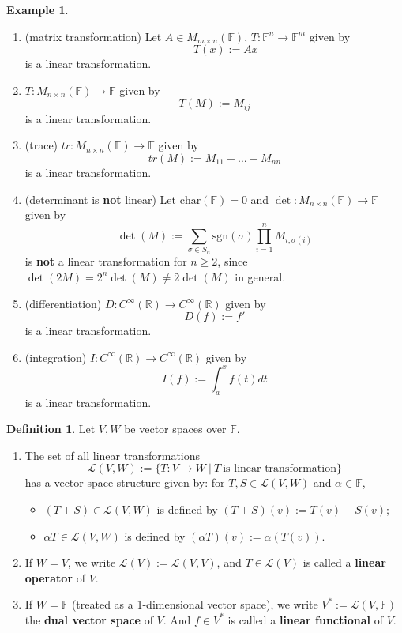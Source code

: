\documentclass[11pt,openany]{book}
\theoremstyle{plain}
\theoremstyle{definition}
\newtheorem{definition}[definition]{Definition}
\newtheorem{example}[example]{Example}
\theoremstyle{remark}
\begin{document}
\begin{example} \label{eg-lineartrans} \
    \begin{enumerate}
        \item (matrix transformation) Let $A \in M_{m \times n}(\mathbb{F})$, $T: \mathbb{F}^n \to \mathbb{F}^m$ given by 
        $$\quad \quad T(x) := Ax$$
        is a linear transformation.
        \item $T: M_{n \times n}(\mathbb{F}) \to \mathbb{F}$ given by 
        $$T(M) := M_{ij}$$ 
        is a linear transformation.
        \item (trace) $tr: M_{n \times n}(\mathbb{F}) \to \mathbb{F}$ given by 
        $$tr(M) := M_{11}+\dots + M_{nn}$$ 
        is a linear transformation.
        \item (determinant is {\bf not} linear) Let $\mathrm{char}(\mathbb{F}) = 0$ and $\det: M_{n \times n}(\mathbb{F}) \to \mathbb{F}$ given by 
        $$\det(M) := \sum_{\sigma \in S_n} \mathrm{sgn}(\sigma) \prod_{i=1}^n M_{i,\sigma(i)}$$ 
        is {\bf not} a linear transformation for $n \geq 2$, since
        $\det(2M) = 2^n\det(M) \neq 2\det(M)$ in general.
        \item (differentiation) $D: C^{\infty}(\mathbb{R}) \to C^{\infty}(\mathbb{R})$ given by 
        $$D(f) := f'$$ 
        is a linear transformation.
        \item (integration) $I: C^{\infty}(\mathbb{R}) \to C^{\infty}(\mathbb{R})$ given by 
        $$I(f) := \int_{a}^{x} f(t)dt$$ 
        is a linear transformation.
    \end{enumerate}
\end{example}

\begin{definition}
    Let $V, W$ be vector spaces over $\mathbb{F}$.
\begin{enumerate}
    \item The set of all linear transformations 
    $$\mathcal{L}(V,W) := \{T:V \to W\ |\ T\ \text{is linear transformation}\}$$
    has a vector space structure given by: for $T,S \in \mathcal{L}(V,W)$ and $\alpha \in \mathbb{F}$,
    \begin{itemize}
        \item $(T+S) \in \mathcal{L}(V,W)$ is defined by $(T+S)(v) := T(v) + S(v)$;
        \item $\alpha T \in \mathcal{L}(V,W)$ is defined by $(\alpha T)(v) := \alpha(T(v))$.
        \end{itemize}
    \item If $W = V$, we write $\mathcal{L}(V) := \mathcal{L}(V,V)$, and $T \in \mathcal{L}(V)$ is called a {\bf linear operator} of $V$.
    \item If $W = \mathbb{F}$ (treated as a 1-dimensional vector space), we write $V^* := \mathcal{L}(V,\mathbb{F})$ the {\bf dual vector space} of $V$. And $f \in V^*$ is called a {\bf linear functional} of $V$.
\end{enumerate} 
\end{definition}
\end{document}
